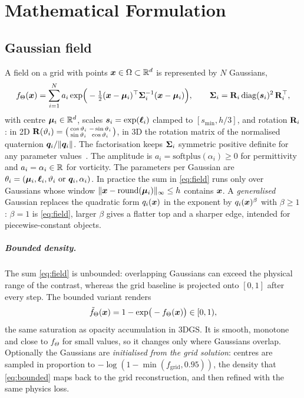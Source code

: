 \chapter{Mathematical Formulation}
\label{ch:formulation}

\section{Gaussian field}
\label{sec:field}
A field on a grid with points $\bm{x}\in\Omega\subset\mathbb{R}^d$ is represented by $N$ Gaussians,
\begin{equation}
  f_\Theta(\bm{x}) = \sum_{i=1}^{N} a_i \exp\!\Big(-\tfrac12(\bm{x}-\bm{\mu}_i)^\top \mathbf{\Sigma}_i^{-1}(\bm{x}-\bm{\mu}_i)\Big),
  \qquad \mathbf{\Sigma}_i = \mathbf{R}_i\,\mathrm{diag}(\bm{s}_i)^2\,\mathbf{R}_i^\top ,
  \label{eq:field}
\end{equation}
with centre $\bm{\mu}_i\in\mathbb{R}^d$, scales $\bm{s}_i=\exp(\bm{\ell}_i)$ clamped to $[s_{\min},h/3]$, and rotation
$\mathbf{R}_i$: in 2D $\mathbf{R}(\vartheta_i)=\begin{psmallmatrix}\cos\vartheta_i & -\sin\vartheta_i\\ \sin\vartheta_i & \cos\vartheta_i\end{psmallmatrix}$,
in 3D the rotation matrix of the normalised quaternion $\bm{q}_i/\lVert\bm{q}_i\rVert$. The factorisation keeps
$\mathbf{\Sigma}_i$ symmetric positive definite for any parameter values~\citep{kerbl20233dgs}. The amplitude is
$a_i=\mathrm{softplus}(\alpha_i)\ge0$ for permittivity and $a_i=\alpha_i\in\mathbb{R}$ for vorticity. The parameters per
Gaussian are $\theta_i=(\bm{\mu}_i,\bm{\ell}_i,\vartheta_i\text{ or }\bm{q}_i,\alpha_i)$. In practice the sum in
\eqref{eq:field} runs only over Gaussians whose window $\lVert\bm{x}-\mathrm{round}(\bm{\mu}_i)\rVert_\infty\le h$
contains $\bm{x}$. A \emph{generalised} Gaussian replaces the quadratic form $q_i(\bm{x})$ in the exponent by
$q_i(\bm{x})^{\beta}$ with $\beta\ge1$: $\beta=1$ is \eqref{eq:field}, larger $\beta$ gives a flatter top and a sharper
edge, intended for piecewise-constant objects.

\paragraph{Bounded density.} The sum \eqref{eq:field} is unbounded: overlapping Gaussians can exceed the physical
range of the contrast, whereas the grid baseline is projected onto $[0,1]$ after every step. The bounded variant
renders
\begin{equation}
  \tilde f_\Theta(\bm{x}) = 1-\exp\!\big(-f_\Theta(\bm{x})\big)\in[0,1),
  \label{eq:bounded}
\end{equation}
the same saturation as opacity accumulation in 3DGS. It is smooth, monotone and close to $f_\Theta$ for small values,
so it changes only where Gaussians overlap. Optionally the Gaussians are \emph{initialised from the grid solution}:
centres are sampled in proportion to $-\log(1-\min(f_{\text{grid}},0.95))$, the density that \eqref{eq:bounded} maps
back to the grid reconstruction, and then refined with the same physics loss.

